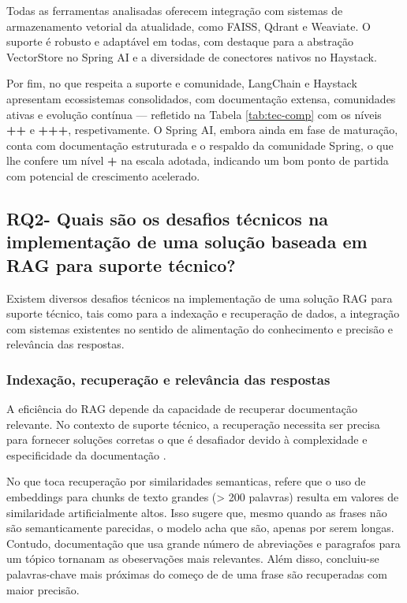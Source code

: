 Todas as ferramentas analisadas oferecem integração com sistemas de armazenamento vetorial da atualidade, como FAISS, Qdrant e Weaviate. O suporte é robusto e adaptável em todas, com destaque para a abstração VectorStore no Spring AI e a diversidade de conectores nativos no Haystack.

Por fim, no que respeita a suporte e comunidade, LangChain e Haystack apresentam ecossistemas consolidados, com documentação extensa, comunidades ativas e evolução contínua — refletido na Tabela \ref{tab:tec-comp} com os níveis \textbf{++} e \textbf{+++}, respetivamente. O Spring AI, embora ainda em fase de maturação, conta com documentação estruturada e o respaldo da comunidade Spring, o que lhe confere um nível \textbf{+} na escala adotada, indicando um bom ponto de partida com potencial de crescimento acelerado.

        

\subsection{RQ2- Quais são os desafios técnicos na implementação de uma solução baseada em RAG para suporte técnico?}

Existem diversos desafios técnicos na implementação de uma solução RAG para suporte técnico, tais como para a indexação e recuperação de dados, a integração com sistemas existentes no sentido de alimentação do conhecimento e precisão e relevância das respostas. 

\subsubsection{Indexação, recuperação e relevância das respostas}

A eficiência do RAG depende da capacidade de recuperar documentação relevante. No contexto de suporte técnico, a recuperação necessita ser precisa para fornecer soluções corretas o que é desafiador devido à complexidade e especificidade da documentação \parencite{ToroIsaza2024}.


No que toca recuperação por similaridades semanticas, \cite{soman2024observations} refere que o uso de embeddings para chunks de texto grandes (> 200 palavras) resulta em valores de similaridade artificialmente altos. Isso sugere que, mesmo quando as frases não são semanticamente parecidas, o modelo acha que são, apenas por serem longas. Contudo, documentação que usa grande número de abreviações e paragrafos para um tópico tornanam as obeservações mais relevantes. Além disso, concluiu-se palavras-chave mais próximas do começo de de uma frase são recuperadas com maior precisão.

